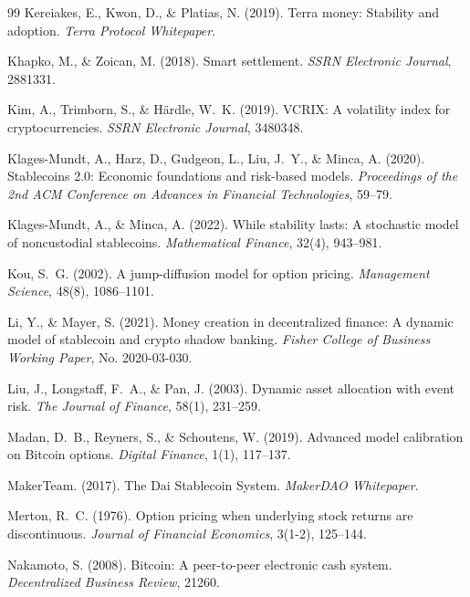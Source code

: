 \documentclass[11pt,a4paper]{article}
\begin{document}
\begin{thebibliography}{99}
Kereiakes, E., Kwon, D., \& Platias, N. (2019).
\newblock Terra money: Stability and adoption.
\newblock \textit{Terra Protocol Whitepaper}.

Khapko, M., \& Zoican, M. (2018).
\newblock Smart settlement.
\newblock \textit{SSRN Electronic Journal}, 2881331.

Kim, A., Trimborn, S., \& H{\"a}rdle, W.~K. (2019).
\newblock VCRIX: A volatility index for cryptocurrencies.
\newblock \textit{SSRN Electronic Journal}, 3480348.

Klages-Mundt, A., Harz, D., Gudgeon, L., Liu, J.~Y., \& Minca, A. (2020).
\newblock Stablecoins 2.0: Economic foundations and risk-based models.
\newblock \textit{Proceedings of the 2nd ACM Conference on Advances in Financial Technologies}, 59--79.

Klages-Mundt, A., \& Minca, A. (2022).
\newblock While stability lasts: A stochastic model of noncustodial stablecoins.
\newblock \textit{Mathematical Finance}, 32(4), 943--981.

Kou, S.~G. (2002).
\newblock A jump-diffusion model for option pricing.
\newblock \textit{Management Science}, 48(8), 1086--1101.

Li, Y., \& Mayer, S. (2021).
\newblock Money creation in decentralized finance: A dynamic model of stablecoin and crypto shadow banking.
\newblock \textit{Fisher College of Business Working Paper}, No. 2020-03-030.

Liu, J., Longstaff, F.~A., \& Pan, J. (2003).
\newblock Dynamic asset allocation with event risk.
\newblock \textit{The Journal of Finance}, 58(1), 231--259.

Madan, D.~B., Reyners, S., \& Schoutens, W. (2019).
\newblock Advanced model calibration on Bitcoin options.
\newblock \textit{Digital Finance}, 1(1), 117--137.

MakerTeam. (2017).
\newblock The Dai Stablecoin System.
\newblock \textit{MakerDAO Whitepaper}.

Merton, R.~C. (1976).
\newblock Option pricing when underlying stock returns are discontinuous.
\newblock \textit{Journal of Financial Economics}, 3(1-2), 125--144.

Nakamoto, S. (2008).
\newblock Bitcoin: A peer-to-peer electronic cash system.
\newblock \textit{Decentralized Business Review}, 21260.


\end{thebibliography}
\end{document}
